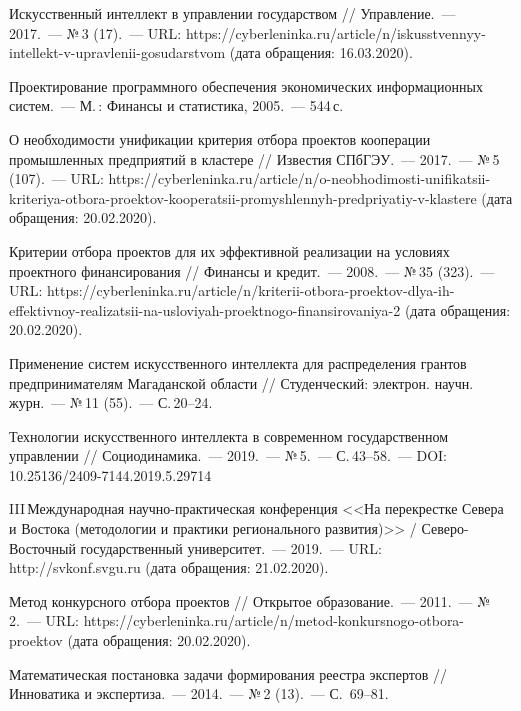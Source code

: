 \begin{thebibliography}{99}

\bibitem{} Искусственный интеллект в управлении государством // Управление.~--- 2017.~--- №\,3 (17).~--- URL: https://cyberleninka.ru/\-arti\-cle/\-n/iskus\-stven\-nyy-intel\-lekt-v-up\-rav\-lenii-gosu\-dars\-tvom (дата обращения: 16.03.2020).

\bibitem{} Проектирование программного обеспечения экономических информационных систем.~--- М.\,: Финансы и статистика, 2005.~--- 544\,с.

\bibitem{} О необходимости унификации критерия отбора проектов кооперации промышленных предприятий в кластере // Известия СПбГЭУ.~--- 2017.~--- №\,5 (107).~--- URL: https://cyberleninka.ru/article/n/o-neobhodimosti-unifikatsii-kriteriya-otbora-proektov-kooperatsii-promyshlennyh-predpriyatiy-v-klastere (дата обращения: 20.02.2020).

\bibitem{} Критерии отбора проектов для их эффективной реализации на условиях проектного финансирования // Финансы и кредит.~--- 2008.~--- №\,35 (323).~--- URL: https://cyberleninka.ru/article/n/kriterii-otbora-proektov-dlya-ih-effektivnoy-realizatsii-na-usloviyah-proektnogo-finansirovaniya-2 (дата обращения: 20.02.2020).

\bibitem{} Применение систем искусственного интеллекта для распределения грантов предпринимателям Магаданской области // Студенческий: электрон. научн. журн.~--- №\,11 (55).~--- С.\,20--24.

\bibitem{} Технологии искусственного интеллекта в современном государственном управлении // Социодинамика.~--- 2019.~--- №\,5.~--- С.\,43--58.~--- DOI: 10.25136/2409-7144.2019.5.29714

\bibitem{}III\,Международная научно-практическая конференция <<На перекрестке Севера и Востока (методологии и практики регионального развития)>> / Северо-Восточный государственный университет.~--- 2019.~--- URL: http://svkonf.svgu.ru (дата обращения: 21.02.2020).

\bibitem{} Метод конкурсного отбора проектов // Открытое образование.~--- 2011.~--- №\,2.~--- URL: https://cyberleninka.ru/article/n/metod-konkursnogo-otbora-proektov (дата обращения: 20.02.2020).

\bibitem{} Математическая постановка задачи формирования реестра экспертов // Инноватика и экспертиза.~--- 2014.~--- №\,2 (13).~--- С.~69--81.


\end{thebibliography}
